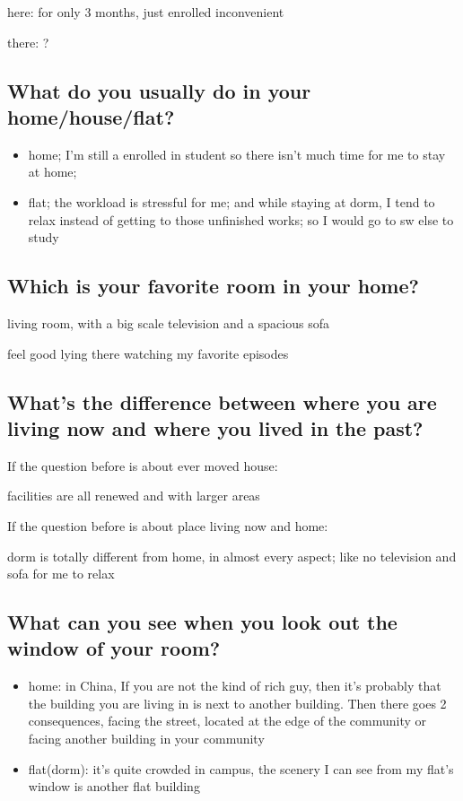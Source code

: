 \documentclass[conference]{IEEEtran}
\begin{document}
here: for only 3 months, just enrolled inconvenient

there: ?

\subsection{What do you usually do in your home/house/flat?}
\begin{itemize}
    \item home; I'm still a enrolled in student so 
    there isn't much time for me to stay at home;
    \item flat; the workload is stressful for me;
    and while staying at dorm, I tend to relax instead of getting to
    those unfinished works; so I would go to sw else to study
\end{itemize}

\subsection{Which is your favorite room in your home?}
living room, with a big scale television and a spacious sofa

feel good lying there watching my favorite episodes

\subsection{What's the difference between 
where you are living now and where you lived in the past?}
If the question before is about ever moved house:

facilities are all renewed and with larger areas

If the question before is about place living now and home:

dorm is totally different from home, in almost every aspect;
like no television and sofa for me to relax

\subsection{What can you see when you look out the window of your room?}
    \begin{itemize}
        \item home: in China, If you are not the kind of rich guy, then
        it's probably that the building you are living in is next to another
        building. Then there goes 2 consequences, facing the street, located
        at the edge of the community or facing another building in your community
        \item flat(dorm): it's quite crowded in campus, the scenery I can see
        from my flat's window is another flat building
    \end{itemize}
\end{document}

